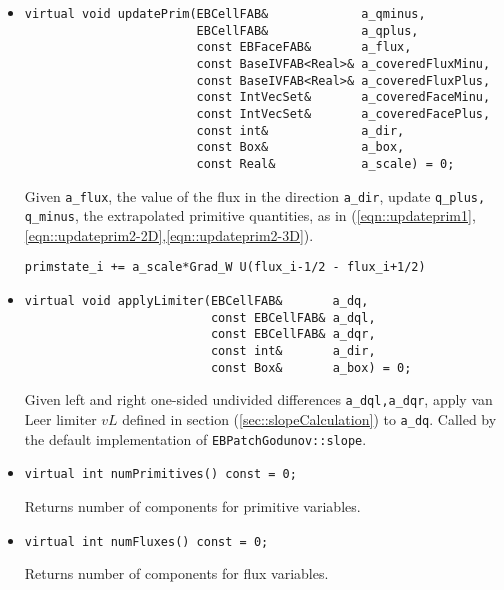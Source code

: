 \begin{itemize}
\item \begin{small}\begin{verbatim}
virtual void updatePrim(EBCellFAB&             a_qminus,
                        EBCellFAB&             a_qplus,
                        const EBFaceFAB&       a_flux,
                        const BaseIVFAB<Real>& a_coveredFluxMinu,
                        const BaseIVFAB<Real>& a_coveredFluxPlus,
                        const IntVecSet&       a_coveredFaceMinu,
                        const IntVecSet&       a_coveredFacePlus,
                        const int&             a_dir,
                        const Box&             a_box,
                        const Real&            a_scale) = 0;
\end{verbatim}\end{small}
Given \verb/a_flux/, the value of the flux in the direction
\verb/a_dir/, update 
\verb/q_plus, q_minus/, the extrapolated primitive
quantities, as in
(\ref{eqn::updateprim1},\ref{eqn::updateprim2-2D},\ref{eqn::updateprim2-3D}).
\begin{verbatim}
primstate_i += a_scale*Grad_W U(flux_i-1/2 - flux_i+1/2)
\end{verbatim}

\item \begin{small}\begin{verbatim}
virtual void applyLimiter(EBCellFAB&       a_dq,
                          const EBCellFAB& a_dql,
                          const EBCellFAB& a_dqr,
                          const int&       a_dir,
                          const Box&       a_box) = 0;
\end{verbatim}\end{small}
Given left and right one-sided undivided differences {\verb/a_dql,a_dqr/},
apply van Leer limiter $vL$ defined in section
(\ref{sec::slopeCalculation}) to {\verb/a_dq/}. 
Called by the default implementation of {\tt EBPatchGodunov::slope}.

\item \begin{small}\begin{verbatim}
virtual int numPrimitives() const = 0;
\end{verbatim}\end{small}
Returns number of components for primitive variables.

\item \begin{small}\begin{verbatim}
virtual int numFluxes() const = 0;
\end{verbatim}\end{small}
Returns number of components for flux variables.


\end{itemize}
